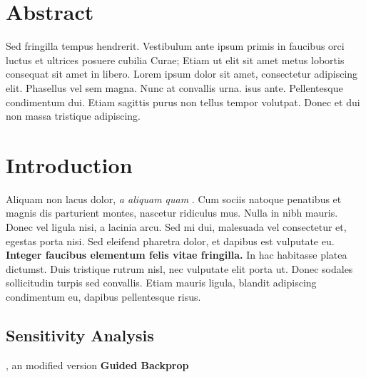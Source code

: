 \documentclass[a0,portrait]{a0poster}
\begin{document}
\begin{multicols}{2} %





\section*{Abstract}
Sed fringilla tempus hendrerit. Vestibulum ante ipsum primis in faucibus orci luctus et ultrices posuere cubilia Curae; Etiam ut elit sit amet metus lobortis consequat sit amet in libero. Lorem ipsum dolor sit amet, consectetur adipiscing elit. Phasellus vel sem magna. Nunc at convallis urna. isus ante. Pellentesque condimentum dui. Etiam sagittis purus non tellus tempor volutpat. Donec et dui non massa tristique adipiscing.

\section*{Introduction}

Aliquam non lacus dolor, \textit{a aliquam quam} \cite{Smith:2012qr}. Cum sociis natoque penatibus et magnis dis parturient montes, nascetur ridiculus mus. Nulla in nibh mauris. Donec vel ligula nisi, a lacinia arcu. Sed mi dui, malesuada vel consectetur et, egestas porta nisi. Sed eleifend pharetra dolor, et dapibus est vulputate eu. \textbf{Integer faucibus elementum felis vitae fringilla.} In hac habitasse platea dictumst. Duis tristique rutrum nisl, nec vulputate elit porta ut. Donec sodales sollicitudin turpis sed convallis. Etiam mauris ligula, blandit adipiscing condimentum eu, dapibus pellentesque risus.

\subsection*{Sensitivity Analysis}
\cite{SimonyanDeepConvolutionalNetworks2013}, an modified version \textbf{Guided Backprop}\cite{SpringenbergStrivingSimplicityAll2015}


\end{multicols}
\end{document}
